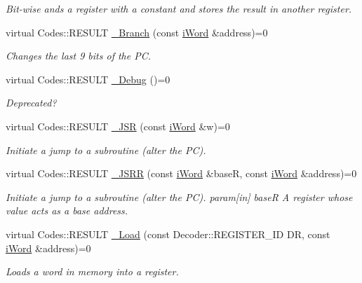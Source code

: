 \begin{DoxyCompactItemize}
\begin{DoxyCompactList}\small\item\em Bit-\/wise ands a register with a constant and stores the result in another register. \item\end{DoxyCompactList}\item 
virtual Codes::RESULT \hyperlink{classiWi11_a42d2c50609424634873413d7a6614397}{\_\-Branch} (const \hyperlink{classiWord}{iWord} \&address)=0
\begin{DoxyCompactList}\small\item\em Changes the last 9 bits of the PC. \item\end{DoxyCompactList}\item 
virtual Codes::RESULT \hyperlink{classiWi11_ae510f127a0c3b87d42cdbe5b14204a65}{\_\-Debug} ()=0
\begin{DoxyCompactList}\small\item\em Deprecated? \item\end{DoxyCompactList}\item 
virtual Codes::RESULT \hyperlink{classiWi11_ace280c40256d3e0c575b08cf6a0d36f5}{\_\-JSR} (const \hyperlink{classiWord}{iWord} \&w)=0
\begin{DoxyCompactList}\small\item\em Initiate a jump to a subroutine (alter the PC). \item\end{DoxyCompactList}\item 
virtual Codes::RESULT \hyperlink{classiWi11_aeabd561f2728e2345b6a5ae5cdd5b84a}{\_\-JSRR} (const \hyperlink{classiWord}{iWord} \&baseR, const \hyperlink{classiWord}{iWord} \&address)=0
\begin{DoxyCompactList}\small\item\em Initiate a jump to a subroutine (alter the PC). param\mbox{[}in\mbox{]} baseR A register whose value acts as a base address. \item\end{DoxyCompactList}\item 
virtual Codes::RESULT \hyperlink{classiWi11_aed1f870b129617436434bb6dcee521ce}{\_\-Load} (const Decoder::REGISTER\_\-ID DR, const \hyperlink{classiWord}{iWord} \&address)=0
\begin{DoxyCompactList}\small\item\em Loads a word in memory into a register. \item\end{DoxyCompactList}\item 

\end{DoxyCompactItemize}
